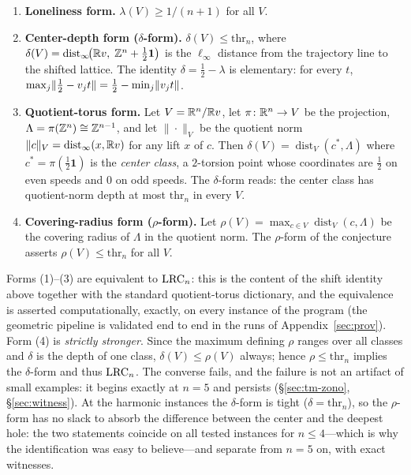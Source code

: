 \begin{enumerate}[leftmargin=1.6em,itemsep=2pt]
\item \textbf{Loneliness form.} $\lambda(V)\ge 1/(n+1)$ for all $V$.
\item \textbf{Center-depth form ($\delta$-form).}
$\delta(V)\le \mathrm{thr}_n$, where
$\delta(V)=\operatorname{dist}_\infty\!\bigl(\mathbb{R} v,\;\mathbb{Z}^n+\tfrac12\mathbf{1}\bigr)$
is the $\ell_\infty$ distance from the trajectory line to the shifted
lattice. The identity
$\delta=\tfrac12-\lambda$ is elementary: for every $t$,
$\max_j \lVert \tfrac12-v_jt \rVert=\tfrac12-\min_j\lVert v_jt \rVert$.
\item \textbf{Quotient-torus form.} Let $V=\mathbb{R}^n/\mathbb{R} v$, let
$\pi\colon\mathbb{R}^n\to V$ be the projection, $\Lambda=\pi(\mathbb{Z}^n)\cong\mathbb{Z}^{n-1}$,
and let $\|\cdot\|_V$ be the quotient norm
$\|c\|_V=\operatorname{dist}_\infty(x,\mathbb{R} v)$ for any lift $x$ of $c$.
Then $\delta(V)=\operatorname{dist}_V(c^*,\Lambda)$ where
$c^*=\pi(\tfrac12\mathbf{1})$ is the \emph{center class}, a $2$-torsion
point whose coordinates are $\tfrac12$ on even speeds and $0$ on odd
speeds. The $\delta$-form reads: the center class has quotient-norm
depth at most $\mathrm{thr}_n$ in every $V$.
\item \textbf{Covering-radius form ($\rho$-form).}
Let $\rho(V)=\max_{c\in V}\operatorname{dist}_V(c,\Lambda)$ be the
covering radius of $\Lambda$ in the quotient norm. The $\rho$-form of the
conjecture asserts $\rho(V)\le\mathrm{thr}_n$ for all $V$.
\end{enumerate}

Forms (1)--(3) are equivalent to $\mathrm{LRC}_n$: this is the content of the
shift identity above together with the standard quotient-torus dictionary,
and the equivalence is asserted computationally, exactly, on every
instance of the program (the geometric pipeline is validated end to end
in the runs of Appendix~\ref{sec:prov}). Form (4) is \emph{strictly
stronger}. Since the maximum defining $\rho$ ranges over all classes and
$\delta$ is the depth of one class, $\delta(V)\le\rho(V)$ always; hence
$\rho\le\mathrm{thr}_n$ implies the $\delta$-form and thus $\mathrm{LRC}_n$. The
converse fails, and the failure is not an artifact of small examples: it
begins exactly at $n=5$ and persists (\S\ref{sec:tm-zono},
\S\ref{sec:witness}). At the harmonic instances the $\delta$-form is
tight ($\delta=\mathrm{thr}_n$), so the $\rho$-form has no slack to
absorb the difference between the center and the deepest hole: the
two statements coincide on all tested instances for $n\le 4$---which is
why the identification was easy to believe---and separate from $n=5$ on,
with exact witnesses.


